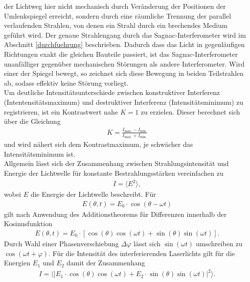 der Lichtweg hier nicht mechanisch durch Veränderung der Positionen der
Umlenkspiegel erreicht, sondern durch eine räumliche Trennung der parallel
verlaufenden Strahlen, von denen ein Strahl durch ein brechendes Medium geführt
wird. Der genaue Strahlengang durch das Sagnac-Interferometer wird im Abschnitt
\ref{durchfuehrung} beschrieben. Dadurch dass das Licht in gegenläufigen
Richtungen exakt die gleichen Bauteile passiert, ist das Sagnac-Interferometer
unanfälliger gegenüber mechanischen Störungen als andere Interferometer. Wird
einer der Spiegel bewegt, so zeichnet sich diese Bewegung in beiden Teilstrahlen
ab, sodass effektiv keine Störung vorliegt. \\
\noindent Um deutliche Intensitätsunterschiede zwischen konstruktiver Interferenz
(Intentensitätsmaximum) und destruktiver Interferenz (Intensitätsminimum) zu
registrieren, ist ein Kontrastwert nahe $K = 1$ zu erzielen. Dieser berechnet
sich über die Gleichung
\begin{align}
  K = \frac{I_\text{max.}- I_\text{min.}}{I_\text{max.} + I_\text{min.}}
  \label{eqn:01}
\end{align}
\noindent und wird nähert sich dem Kontrastmaximum, je schwächer das
Intensitätsminimum ist. \\
\noindent Allgemein lässt sich der Zusammenhang zwischen Strahlungsintensität
und Energie der Lichtwelle für konstante Bestrahlungsstärken vereinfachen zu
\begin{align}
  I = \langle E^2 \rangle,
  \label{eqn:02}
\end{align}
\noindent wobei $E$ die Energie der Lichtwelle beschreibt. Für
\begin{align}
  E(\theta, t) = E_0 \cdot \cos(\theta - \omega t)
  \label{eqn:03}
\end{align}
\noindent gilt nach Anwendung des Additionstheorems für Differenzen innerhalb der
Kosinusfunktion
\begin{align}
  E(\theta, t) = E_0 \cdot \left[\cos(\theta) \cos(\omega t) + \sin(\theta) \sin(\omega t) \right].
  \label{eqn:04}
\end{align}
\noindent Durch Wahl einer Phasenverschiebung $\Delta \varphi$ lässt sich
$\sin(\omega t)$ umschreiben zu $\cos(\omega t + \varphi)$. Für die Intensität
des interferierenden Laserlichts gilt für die Energien $E_1$ und $E_2$ damit
der Zusammenhang
\begin{align}
  I = \langle | E_1 \cdot \cos(\theta) \cos(\omega t) + E_2 \cdot \sin(\theta) \sin(\omega t) |^2 \rangle.
  \label{eqn:05}
\end{align}
